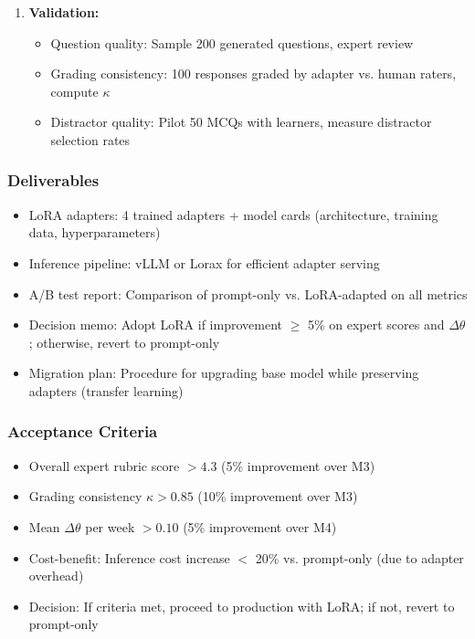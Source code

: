 \documentclass[11pt,letterpaper]{article}
\begin{document}
\begin{enumerate}
\item \textbf{Validation:}
\begin{itemize}
\item Question quality: Sample 200 generated questions, expert review
\item Grading consistency: 100 responses graded by adapter vs. human raters, compute $\kappa$
\item Distractor quality: Pilot 50 MCQs with learners, measure distractor selection rates
\end{itemize}
\end{enumerate}

\subsubsection{Deliverables}
\begin{itemize}
\item LoRA adapters: 4 trained adapters + model cards (architecture, training data, hyperparameters)
\item Inference pipeline: vLLM or Lorax for efficient adapter serving
\item A/B test report: Comparison of prompt-only vs. LoRA-adapted on all metrics
\item Decision memo: Adopt LoRA if improvement $\geq$ 5\% on expert scores and $\Delta\theta$; otherwise, revert to prompt-only
\item Migration plan: Procedure for upgrading base model while preserving adapters (transfer learning)
\end{itemize}

\subsubsection{Acceptance Criteria}
\begin{itemize}
\item Overall expert rubric score $> 4.3$ (5\% improvement over M3)
\item Grading consistency $\kappa > 0.85$ (10\% improvement over M3)
\item Mean $\Delta\theta$ per week $> 0.10$ (5\% improvement over M4)
\item Cost-benefit: Inference cost increase $<$ 20\% vs. prompt-only (due to adapter overhead)
\item Decision: If criteria met, proceed to production with LoRA; if not, revert to prompt-only
\end{itemize}
\end{document}
